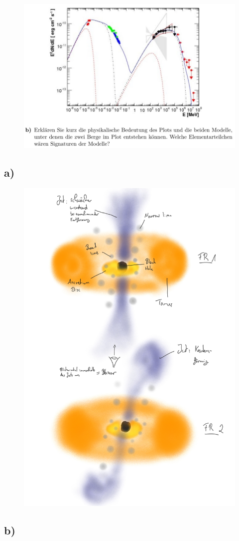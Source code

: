 \begin{figure}[H]
    \centering
    \includegraphics[width=\textwidth]{images/Aufgabe30b.jpg}
\end{figure}

\subsection{a)}

\begin{figure}[H]
    \centering
    \includegraphics[width=\textwidth]{images/30a.jpg}
\end{figure}

\subsection{b)}

